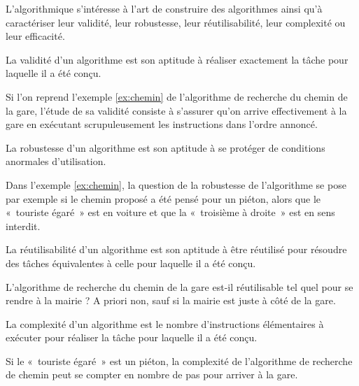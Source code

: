 L'algorithmique s'intéresse à l'art de construire des algorithmes ainsi
qu'à caractériser leur validité, leur robustesse, leur réutilisabilité, 
leur complexité ou leur efficacité.

\begin{defin}
La validité d'un algorithme est son aptitude à réaliser exactement la tâche
pour laquelle il a été conçu.
\end{defin}
\noindent Si l'on reprend l'exemple \ref{ex:chemin} de l'algorithme de recherche du chemin
de la gare, l'étude de sa validité consiste à s'assurer qu'on arrive effectivement 
à la gare en exécutant scrupuleusement les instructions dans l'ordre annoncé.

\begin{defin}
La robustesse d'un algorithme est son aptitude à se protéger de conditions 
anormales d'utilisation.
\end{defin}
\noindent Dans l'exemple \ref{ex:chemin}, la question de la robustesse de l'algorithme
se pose par exemple si le chemin proposé a été pensé pour un piéton, alors que le 
«~touriste égaré~» est en voiture et que la «~troisième à droite~» est en sens interdit.

\begin{defin}
\mbox{}
La réutilisabilité d'un algorithme est son aptitude à être réutilisé pour résoudre
des tâches équivalentes à celle pour laquelle il a été conçu.
\end{defin}
\noindent L'algorithme de recherche du chemin de la gare est-il réutilisable tel quel pour se rendre
à la mairie ? A priori non, sauf si la mairie est juste à côté de la gare.


\begin{defin}
La complexité d'un algorithme est le nombre d'instructions élémentaires à exécuter pour
réaliser la tâche pour laquelle il a été conçu.
\end{defin}
\noindent Si le «~touriste égaré~» est un piéton, la complexité de l'algorithme de recherche de chemin
peut se compter en nombre de pas pour arriver à la gare.

